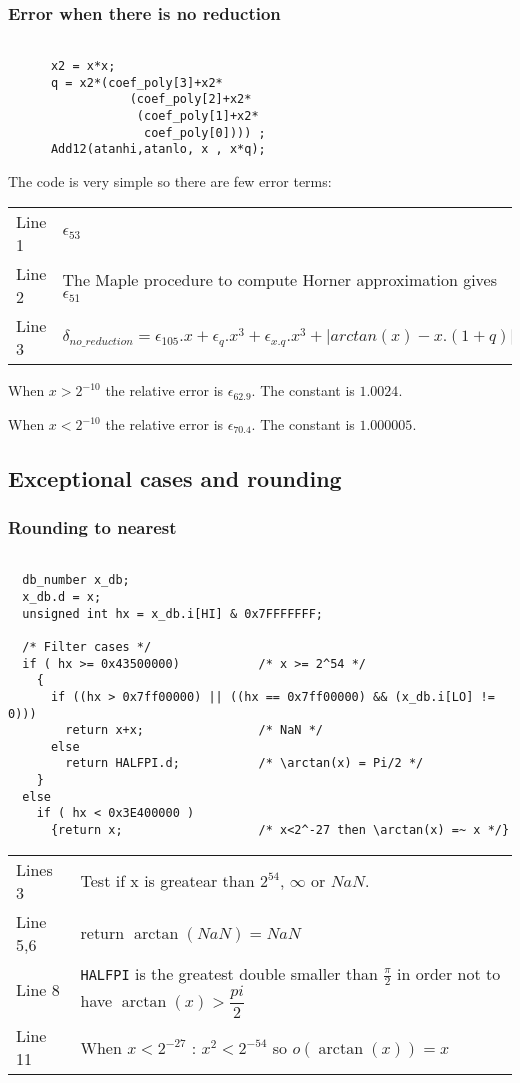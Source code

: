 \subsubsection{Error when there is no reduction}
\begin{lstlisting}[caption={No reduction},firstnumber=1]

      x2 = x*x;
      q = x2*(coef_poly[3]+x2*
                 (coef_poly[2]+x2*
                  (coef_poly[1]+x2*
                   coef_poly[0]))) ;
      Add12(atanhi,atanlo, x , x*q);

\end{lstlisting}

The code is very simple so there are few error terms:

\begin{tabular}{ll}
Line 1 & $\epsilon_{53}$ \\
Line 2 & The Maple procedure to compute Horner approximation gives $\epsilon_{51}$\\
Line 3 & $\delta_{no\_reduction} = \epsilon_{105}.x + \epsilon_q.x^3 + 
\epsilon_{x.q}.x^3 + |arctan(x) - x.(1+q)| $
\end{tabular}

When $x>2^{-10}$ the relative error is $\epsilon_{62.9}$. The
constant is $1.0024$. 

When $x<2^{-10}$ the relative error is $\epsilon_{70.4}$. The
constant is $1.000005$. 

\bigskip

\subsection{Exceptional cases and rounding}
\subsubsection{Rounding to nearest}
\begin{lstlisting}[caption={Exceptional cases : rounding to nearest},firstnumber=1]

  db_number x_db;
  x_db.d = x;
  unsigned int hx = x_db.i[HI] & 0x7FFFFFFF; 

  /* Filter cases */
  if ( hx >= 0x43500000)           /* x >= 2^54 */
    {
      if ((hx > 0x7ff00000) || ((hx == 0x7ff00000) && (x_db.i[LO] != 0)))
        return x+x;                /* NaN */
      else
        return HALFPI.d;           /* \arctan(x) = Pi/2 */
    }
  else
    if ( hx < 0x3E400000 )
      {return x;                   /* x<2^-27 then \arctan(x) =~ x */}

\end{lstlisting}
\begin{tabular}{ll}
Lines 3 & Test if x is greatear than $2^{54}$, $\infty$ or $NaN$. \\
Line 5,6 & return $\arctan(NaN) = NaN$\\
Line 8 & \texttt{HALFPI} is the greatest double smaller than
$\frac{\pi}{2}$ in order not to have $\arctan(x) > \dfrac{pi}{2}$ \\
Line 11 & When $x<2^{-27}$ : $x^2 < 2^{-54}$ so $o(\arctan(x)) = x$
\end{tabular}
\\

